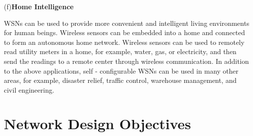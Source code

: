  (f)\textbf{Home Intelligence}


WSNs can be used to provide more convenient and intelligent living environments for human beings. Wireless sensors can be embedded into a home and connected to form an autonomous home network. Wireless sensors can be used to remotely read utility meters in a home, for example, water, gas, or electricity, and then send the readings to a remote center through wireless communication. In addition to the above applications, self - configurable WSNs can be used in many other areas, for example, disaster relief, traffic control, warehouse management, and civil engineering.

\section{Network Design Objectives}
